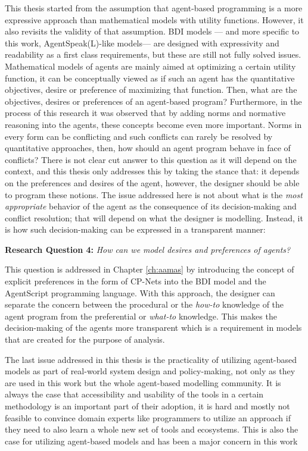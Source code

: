 This thesis started from the assumption that agent-based programming is a more expressive approach than mathematical models with utility functions. However, it also revisits the validity of that assumption. BDI models --- and more specific to this work, AgentSpeak(L)-like models--- are designed with expressivity and readability as a first class requirements, but these are still not fully solved issues. Mathematical models of agents are mainly aimed at optimizing a certain utility function, it can be conceptually viewed as if such an agent has the quantitative objectives, desire or preference of maximizing that function. Then, what are the objectives, desires or preferences of an agent-based program? Furthermore, in the process of this research it was observed that by adding norms and normative reasoning into the agents, these concepts become even more important. Norms in every form can be  conflicting and such conflicts can rarely be resolved by quantitative approaches, then, how should an agent program behave in face of conflicts? There is not clear cut answer to this question as it will depend on the context, and this thesis only addresses this by taking the stance that:  it depends on the preferences and desires of the agent, however, the designer should be able to program these notions. The issue addressed here is not about what is the \textit{most appropriate} behavior of the agent as the consequence of its decision-making and conflict resolution; that will depend on what the designer is modelling. Instead, it is how such decision-making can be expressed in a transparent manner:

\begin{displayquote}
\textbf{Research Question 4:} \textit{How can we model desires and preferences of agents?}
\end{displayquote}

This question is addressed in Chapter \ref{ch:aamas} by introducing the concept of explicit preferences in the form of CP-Nets into the BDI model and the AgentScript programming language. With this approach, the designer can separate the concern between the procedural or the \textit{how-to} knowledge of the agent program from the preferential or \textit{what-to} knowledge. This makes the decision-making of the agents more transparent which is a requirement in models that are created for the purpose of analysis. 

The last issue addressed in this thesis is the practicality of utilizing agent-based models as part of real-world system design and policy-making, not only as they are used in this work but the whole agent-based modelling community. It is always the case that accessibility and usability of the tools in a certain methodology is an important part of their adoption, it is hard and mostly not feasible to convince domain experts like programmers to utilize an approach if they need to also learn a whole new set of tools and ecosystems. This is also the case for utilizing agent-based models and has been a major concern in this work

